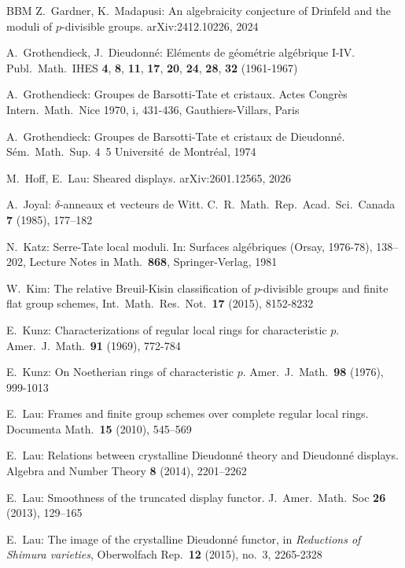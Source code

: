 \documentclass[a4paper,11pt]{article}
\theoremstyle{plain}
\theoremstyle{definition}
\theoremstyle{remark}
\theoremstyle{definition}
\numberwithin{Lemma}{section}
\numberwithin{Subpoint}{Lemma}
\numberwithin{equation}{section}
\begin{document}
\begin{thebibliography}{BBM}
Z.~Gardner, K.~Madapusi:
An algebraicity conjecture of Drinfeld and the moduli of $p$-divisible groups.
arXiv:2412.10226, 2024

A.~Grothendieck, J.~Dieudonn\'e:
El\'ements de g\'eom\'etrie alg\'ebrique I-IV. 
Publ.\ Math.\ IHES  {\bf 4}, {\bf 8}, {\bf 11}, {\bf 17}, {\bf 20}, {\bf 24}, {\bf 28}, {\bf 32}
(1961-1967)  

A.~Grothendieck:
Groupes de Barsotti-Tate et cristaux.
Actes Congr\`es Intern.\ Math.\ Nice 1970, i, 431-436, Gauthiers-Villars, Paris

A.~Grothendieck:
Groupes de Barsotti-Tate et cristaux de Dieudonn\'e.
S\'em.\ Math.\ Sup. 4~5
Universit\'e\ de Montr\'{e}al, 1974

M.~Hoff, E.~Lau:
Sheared displays.
arXiv:2601.12565, 2026

A.~Joyal: 
$\delta$-anneaux et vecteurs de Witt.
C.\ R.\ Math.\ Rep.\ Acad.\ Sci.\ Canada {\bf 7} (1985), 177--182

N.~Katz:
Serre-Tate local moduli. 
In: Surfaces alg\'ebriques (Orsay, 1976-78), 138--202,
Lecture Notes in Math.\  {\bf 868}, Springer-Verlag, 1981

W.~Kim:
The relative {B}reuil-{K}isin classification of {$p$}-divisible groups and finite flat group schemes,
Int.\ Math.\ Res.\ Not.\ {\bf 17} (2015),  8152-8232

E.~Kunz:
Characterizations of regular local rings for characteristic $p$. 
Amer.\ J.\ Math.\ {\bf 91} (1969), 772-784

E.~Kunz:
On Noetherian rings of characteristic $p$. 
Amer.\ J.\ Math.\ {\bf 98} (1976), 999-1013

E.~Lau:
Frames and finite group schemes over complete
regular local rings.
Documenta Math.\ {\bf 15} (2010), 545--569

E.~Lau:
Relations between crystalline Dieudonn\'e theory and Dieudonn\'e displays.
Algebra and Number Theory {\bf 8} (2014), 2201--2262

E.~Lau:
Smoothness of the truncated display functor.
J.\ Amer.\ Math.\ Soc {\bf 26} (2013), 129--165

E.~Lau:
The image of the crystalline Dieudonn\'e functor,
in {\em Reductions of Shimura varieties},
Oberwolfach Rep.\ {\bf 12} (2015), no.\ 3, 2265-2328


\end{thebibliography}
\end{document}
